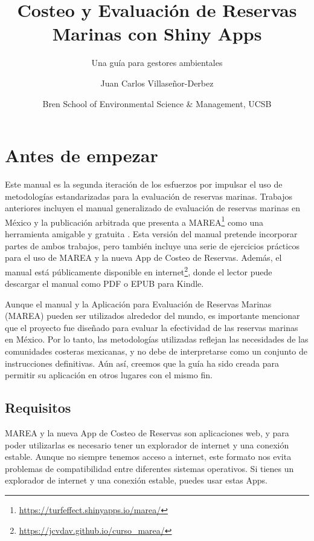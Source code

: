 \documentclass[]{krantz}
\title{Costeo y Evaluación de Reservas Marinas con Shiny Apps}
\subtitle{Una guía para gestores ambientales}
\author{Juan Carlos Villaseñor-Derbez}
\date{Bren School of Environmental Science \& Management, UCSB}
\renewcommand{\href}[2]{#2\footnote{\url{#1}}}
\begin{document}
\maketitle

{
\setcounter{tocdepth}{2}
\tableofcontents
}
\hypertarget{antes-de-empezar}{%
\chapter*{Antes de empezar}\label{antes-de-empezar}}


Este manual es la segunda iteración de los esfuerzos por impulsar el uso
de metodologías estandarizadas para la evaluación de reservas marinas.
Trabajos anteriores incluyen el manual generalizado de evaluación de
reservas marinas en México \citep{villaseorderbez_2017} y la publicación
arbitrada que presenta a
\href{https://turfeffect.shinyapps.io/marea/}{MAREA} como una
herramienta amigable y gratuita \citep{villasenorderbez_2018}. Esta
versión del manual pretende incorporar partes de ambos trabajos, pero
también incluye una serie de ejercicios prácticos para el uso de MAREA y
la nueva App de Costeo de Reservas. Además, el manual está públicamente
disponible en \href{https://jcvdav.github.io/curso_marea/}{internet},
donde el lector puede descargar el manual como PDF o EPUB para Kindle.

Aunque el manual y la Aplicación para Evaluación de Reservas Marinas
(MAREA) pueden ser utilizados alrededor del mundo, es importante
mencionar que el proyecto fue diseñado para evaluar la efectividad de
las reservas marinas en México. Por lo tanto, las metodologías
utilizadas reflejan las necesidades de las comunidades costeras
mexicanas, y no debe de interpretarse como un conjunto de instrucciones
definitivas. Aún así, creemos que la guía ha sido creada para permitir
su aplicación en otros lugares con el mismo fin.

\hypertarget{requisitos}{%
\section{Requisitos}\label{requisitos}}

MAREA y la nueva App de Costeo de Reservas son aplicaciones web, y para
poder utilizarlas es necesario tener un explorador de internet y una
conexión estable. Aunque no siempre tenemos acceso a internet, este
formato nos evita problemas de compatibilidad entre diferentes sistemas
operativos. Si tienes un explorador de internet y una conexión estable,
puedes usar estas Apps.
\end{document}
